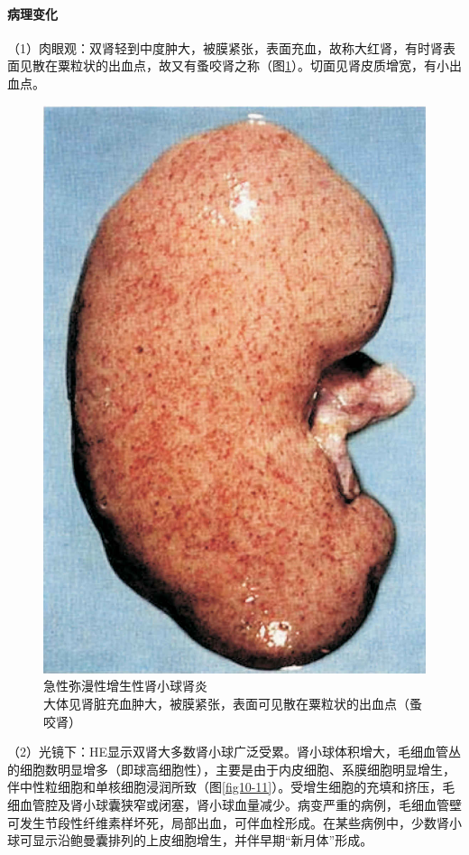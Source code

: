 \paragraph{病理变化}
（1）肉眼观：双肾轻到中度肿大，被膜紧张，表面充血，故称大红肾，有时肾表面见散在粟粒状的出血点，故又有蚤咬肾之称（图\ref{fig10-10}）。切面见肾皮质增宽，有小出血点。

\begin{figure}[!htbp]
 \centering
 \includegraphics{./images/Image00156.jpg}
 \captionsetup{justification=centering}
 \caption{急性弥漫性增生性肾小球肾炎\\ {\small 大体见肾脏充血肿大，被膜紧张，表面可见散在粟粒状的出血点（蚤咬肾）}}
\label{fig10-10}
  \end{figure}

（2）光镜下：HE显示双肾大多数肾小球广泛受累。肾小球体积增大，毛细血管丛的细胞数明显增多（即球高细胞性），主要是由于内皮细胞、系膜细胞明显增生，伴中性粒细胞和单核细胞浸润所致（图\ref{fig10-11}）。受增生细胞的充填和挤压，毛细血管腔及肾小球囊狭窄或闭塞，肾小球血量减少。病变严重的病例，毛细血管壁可发生节段性纤维素样坏死，局部出血，可伴血栓形成。在某些病例中，少数肾小球可显示沿鲍曼囊排列的上皮细胞增生，并伴早期“新月体”形成。


